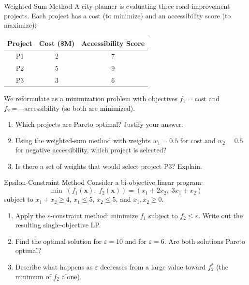 \begin{ex}{Weighted Sum Method}{}
\label{ex:weighted-sum-projects}
A city planner is evaluating three road improvement projects. Each project has a cost (to minimize) and an accessibility score (to maximize):

\begin{center}
\begin{tabular}{c|c|c}
\textbf{Project} & \textbf{Cost (\$M)} & \textbf{Accessibility Score} \\
\hline
P1 & 2 & 7 \\
P2 & 5 & 9 \\
P3 & 3 & 6 \\
\end{tabular}
\par{}\label{tab:multi-objective-optimization_updated-tab03}%

\end{center}

We reformulate as a minimization problem with objectives $f_1 = \text{cost}$ and $f_2 = -\text{accessibility}$ (so both are minimized).

\begin{enumerate}
\item Which projects are Pareto optimal? Justify your answer.
\item Using the weighted-sum method with weights $w_1 = 0.5$ for cost and $w_2 = 0.5$ for negative accessibility, which project is selected?
\item Is there a set of weights that would select project P3? Explain.
\end{enumerate}
\end{ex}

\begin{ex}{Epsilon-Constraint Method}{}
\label{ex:eps-constraint-lp}
Consider a bi-objective linear program:
\[
\min \; (f_1(\mathbf{x}), \; f_2(\mathbf{x})) = (x_1 + 2x_2, \; 3x_1 + x_2)
\]
subject to $x_1 + x_2 \geq 4$, $x_1 \leq 5$, $x_2 \leq 5$, and $x_1, x_2 \geq 0$.

\begin{enumerate}
\item Apply the $\varepsilon$-constraint method: minimize $f_1$ subject to $f_2 \leq \varepsilon$. Write out the resulting single-objective LP.
\item Find the optimal solution for $\varepsilon = 10$ and for $\varepsilon = 6$. Are both solutions Pareto optimal?
\item Describe what happens as $\varepsilon$ decreases from a large value toward $f_2^*$ (the minimum of $f_2$ alone).
\end{enumerate}
\end{ex}

